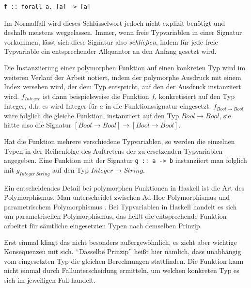 \begin{verbatim}
f :: forall a. [a] -> [a]
\end{verbatim}

Im Normalfall wird dieses Schlüsselwort jedoch nicht explizit benötigt und deshalb meistens weggelassen. Immer, wenn
freie Typvariablen in einer Signatur vorkommen, lässt sich diese Signatur also \textit{schließen}, indem für jede freie Typvariable
ein entsprechender Allquantor an den Anfang gesetzt wird.

Die Instanziierung einer polymorphen Funktion auf einen konkreten Typ wird im weiteren Verlauf der Arbeit notiert, indem der
polymorphe Ausdruck mit einem Index versehen wird, der dem Typ entspricht, auf den der Ausdruck instanziiert wird.
$f_{Integer}$ ist dann beispielsweise die Funktion $f$, konkretisiert auf den Typ Integer, d.h. es wird Integer
für $a$ in die Funktionssignatur eingesetzt. $f_{Bool \rightarrow Bool}$ wäre folglich die gleiche Funktion, instanziiert auf den Typ
$Bool \rightarrow Bool$, sie hätte also die Signatur $[Bool \rightarrow Bool] \rightarrow [Bool \rightarrow Bool]$.

Hat die Funktion mehrere verschiedene Typvariablen, so werden die einzelnen Typen
in der Reihenfolge des Auftretens der zu ersetzenden Typvariablen angegeben. Eine Funktion mit der Signatur \texttt{g :: a -> b} instanziiert man
folglich mit $g_{Integer\ String}$ auf den Typ $Integer \rightarrow String$.


Ein entscheidendes Detail bei polymorphen Funktionen in Haskell ist die Art des Polymorphismus.
Man unterscheidet zwischen Ad-Hoc Polymorphismus und parametrischem Poly\-mor\-phis\-mus . Bei Typvariablen
in Haskell handelt es sich um parametrischen Polymorphismus, das heißt die entsprechende Funktion arbeitet für sämtliche
eingesetzten Typen nach demselben Prinzip.

Erst einmal klingt das nicht besonders außergewöhnlich, es zieht aber wichtige
Konsequenzen mit sich. ``Dasselbe Prinzip'' heißt hier nämlich, dass unabhängig vom eingesetzten Typ die gleichen
Berechnungen stattfinden. Die Funktion kann nicht einmal
durch Fallunterscheidung ermitteln, um welchen konkreten Typ es sich im jeweiligen Fall handelt.

